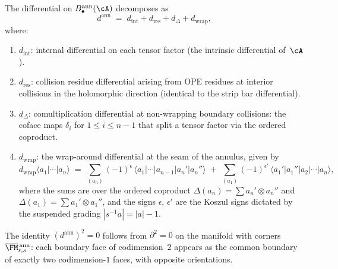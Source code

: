 \begin{theorem}%
\label{thm:annular-bar-differential}%
%
The differential on $B^{\mathrm{ann}}_\bullet(\cA)$
decomposes as
\[
d^{\mathrm{ann}}
\;=\;
d_{\mathrm{int}}+d_{\mathrm{res}}
 +d_\Delta+d_{\mathrm{wrap}},
\]
where:
\begin{enumerate}[label=\textup{(\alph*)}]
\item $d_{\mathrm{int}}$: internal differential on each
 tensor factor (the intrinsic differential of~$\cA$).

\item $d_{\mathrm{res}}$: collision residue differential
 arising from OPE residues at interior collisions in the
 holomorphic direction
 (identical to the strip bar differential).

\item $d_\Delta$: comultiplication differential at
 non-wrapping boundary collisions: the coface maps
 $\delta_i$ for $1\le i\le n-1$ that split a tensor factor
 via the ordered coproduct.

\item $d_{\mathrm{wrap}}$: the wrap-around differential
 at the seam of the annulus, given by
\begin{equation}\label{eq:d-wrap}
d_{\mathrm{wrap}}\langle a_1|\cdots|a_n\rangle
\;=\;
\sum_{(a_n)}
(-1)^{\epsilon}\,
\langle a_1|\cdots|a_{n-1}|a_n'|a_n''\rangle
\;+\;
\sum_{(a_1)}
(-1)^{\epsilon'}\,
\langle a_1'|a_1''|a_2|\cdots|a_n\rangle,
\end{equation}
where the sums are over the ordered coproduct
$\Delta(a_n)=\sum a_n'\otimes a_n''$ and
$\Delta(a_1)=\sum a_1'\otimes a_1''$, and the signs
$\epsilon$, $\epsilon'$ are the Koszul signs dictated by the
suspended grading $|s^{-1}a|=|a|-1$.
\end{enumerate}
The identity $(d^{\mathrm{ann}})^2=0$ follows from
$\partial^2=0$ on the manifold with corners
$\overline{\FM}{}^{\,\mathrm{ann}}_{r,s}$: each boundary
face of codimension~$2$ appears as the common boundary
of exactly two codimension-$1$ faces, with opposite orientations.
\end{theorem}

